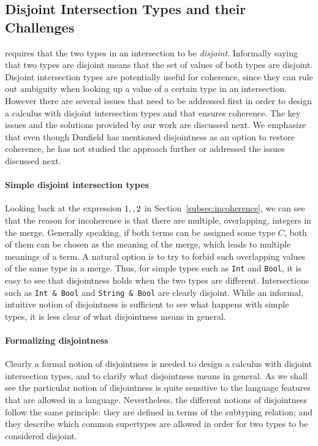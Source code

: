 \subsection{Disjoint Intersection Types and their Challenges}\label{subsec:challenges}
\name requires that the
two types in an intersection to be \emph{disjoint}.
Informally saying that two types are disjoint means that the set of
values of both types are disjoint. Disjoint intersection types are
potentially useful for coherence, since they can rule out ambiguity
when looking up a value of a certain type in an intersection. However
there are several issues that need to be addressed first in order to
design a calculus with disjoint intersection types and that ensures
coherence. The key issues and the solutions provided by our work are
discussed next. We emphasize that even though Dunfield
has mentioned disjointness as an option to restore coherence, he
has not studied the approach further or addressed the issues discussed next.

\paragraph{Simple disjoint intersection types}
Looking back at the expression $1 ,, 2$ in
Section~\ref{subsec:incoherence}, we can see that the reason for
incoherence is that there are multiple, overlapping, integers in the
merge. Generally speaking, if both terms can be assigned some type
$C$, both of them can be chosen as the meaning of the merge, which
leads to multiple meanings of a term. A natural option is to try
to forbid such overlapping values of the same type in a merge.
Thus, for simple types such as \lstinline$Int$ and \lstinline$Bool$, it is
easy to see that disjointness holds when the two types are
different. Intersections such as \lstinline$Int & Bool$ and 
\lstinline$String & Bool$ are clearly disjoint.
While an informal, intuitive notion of disjointness is sufficient to
see what happens with simple types, it is less clear of what
disjointness means in general.

\paragraph{Formalizing disjointness} 
Clearly a formal notion of disjointness is needed to design a
calculus with disjoint intersection types, and to clarify what
disjointness means in general.
As we shall see the particular notion of disjointness is quite
sensitive to the language features that are allowed in a language.
Nevertheless, the different notions of disjointness follow the same
principle: they are defined in terms of the subtyping relation; 
and they describe which common supertypes are allowed in order for 
two types to be considered disjoint.

